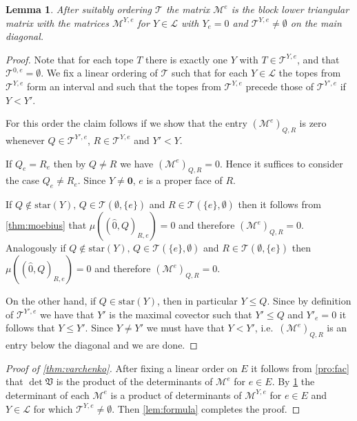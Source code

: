 \documentclass[12pt]{amsart}
\def\Var{{\mathfrak V}}
\def\Tscr{{\mathcal T}}
\def\cstar{{\mathrm{star}}}
\theoremstyle{plain}
\newtheorem{Lemma}{Lemma}
\numberwithin{Lemma}{\DefaultNumberTheoremWithin}
\numberwithin{Claim}{\DefaultNumberTheoremWithin}
\numberwithin{Theorem}{\DefaultNumberTheoremWithin}
\numberwithin{Corollary}{\DefaultNumberTheoremWithin}
\numberwithin{Proposition}{\DefaultNumberTheoremWithin}
\numberwithin{Conjecture}{\DefaultNumberTheoremWithin}
\numberwithin{Situation}{\DefaultNumberTheoremWithin}
\numberwithin{Note}{\DefaultNumberTheoremWithin}
\theoremstyle{definition}
\numberwithin{Definition}{\DefaultNumberTheoremWithin}
\theoremstyle{definition}
\numberwithin{Question}{\DefaultNumberTheoremWithin}
\theoremstyle{definition}
\numberwithin{Problem}{\DefaultNumberTheoremWithin}
\theoremstyle{remark} \newtheorem{Remark}{Remark}
\numberwithin{Remark}{\DefaultNumberTheoremWithin}
\theoremstyle{remark}
\numberwithin{Example}{\DefaultNumberTheoremWithin}
\numberwithin{Case}{Lemma}
\numberwithin{Step}{Lemma}
\begin{document}
\begin{Lemma}
  \label{lem:block}
  After suitably ordering $\Tscr$ the matrix $\mathcal{M}^e$ is the block 
  lower triangular matrix
  with the matrices $\mathcal{M}^{Y,e}$ for $Y \in \mathcal{L}$ with $Y_e = 0$ and
  $\Tscr^{Y,e} \neq \emptyset$ on the main
  diagonal.
\end{Lemma}
\begin{proof}
Note that for each tope $T$ there is exactly one $Y$ with $T \in \mathcal{T}^{Y,e}$, and
that $\mathcal{T}^{0,e} = \emptyset$. We fix a linear ordering of $\Tscr$ such that for each $Y \in \mathcal{L}$
the topes from $\Tscr^{Y,e}$ form an interval and such that the topes from $\Tscr^{Y,e}$
precede those of $\Tscr^{Y',e}$ if $Y < Y'$.

  For this order the claim follows if we show that the entry $(\mathcal{M}^e)_{Q,R}$ is zero 
  whenever $Q \in \Tscr^{Y',e}$, $R \in \Tscr^{Y,e}$ and $Y' < Y$.

  If $Q_e = R_e$ then by $Q \neq R$ we have 
  $(\mathcal{M}^e)_{Q,R} = 0$. Hence it suffices to consider the case $Q_e \neq R_e$. Since $Y \neq \mathbf{0}$, $e$ is a proper face of $R$.
 
 If $Q \not\in \cstar(Y),\, Q \in \Tscr(\emptyset,\{e\})$ and $R\in \Tscr(\{e\},\emptyset)$ then 
  it follows from \ref{thm:moebius} that 
  $\mu((\hat{0},Q)_{R,e}) = 0$ and therefore $(\mathcal{M}^e)_{Q,R} = 0$. 
  Analogously if $Q \not\in \cstar(Y),\,Q \in \Tscr(\{e\},\emptyset)$ and $R\in \Tscr(\emptyset,\{e\})$ then 
  $\mu((\hat{0},Q)_{R,e}) = 0$ and therefore $(\mathcal{M}^e)_{Q,R} = 0$. 

  On the other hand, if $Q \in \cstar(Y)$, then in particular $Y \leq
  Q$. Since by definition of $\Tscr^{Y',e}$ we have that $Y'$ is the
  maximal covector such that $Y' \leq Q$ and $Y'_e=0$ it follows that
  $Y \leq Y'$.  Since $Y \neq Y'$ we must have that $Y < Y'$, i.e.\
  $(\mathcal{M}^e)_{Q,R}$ is an entry below the diagonal and we are done.

\end{proof}

\begin{proof}[Proof of \ref{thm:varchenko}]
  After fixing a linear order on $E$ it follows from \ref{pro:fac} 
  that $\det \Var$ is 
  the product of the determinants of $\mathcal{M}^e$ for $e \in E$.  
  By \ref{lem:block} the determinant of each $\mathcal{M}^e$ is
  a product of determinants of $\mathcal{M}^{Y,e}$ for $e \in E$ and $Y \in \mathcal{L}$
  for which $\Tscr^{Y,e} \neq \emptyset$. Then \ref{lem:formula} completes
  the proof.
\end{proof}
\end{document}
